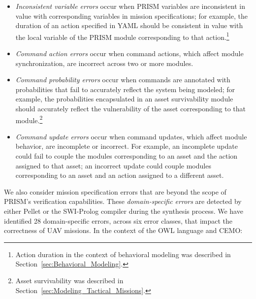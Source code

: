 \begin{itemize}

\item\emph{Inconsistent variable errors} occur when PRISM variables are inconsistent in value with corresponding variables in mission specifications; for example, the duration of an action specified in YAML should be consistent in value with the local variable of the PRISM module corresponding to that action.\footnote{Action duration in the context of behavioral modeling was described in Section~\ref{sec:Behavioral_Modeling}.}

\item\emph{Command action errors} occur when command actions, which affect module synchronization, are incorrect across two or more modules.

\item\emph{Command probability errors} occur when commands are annotated with probabilities that fail to accurately reflect the system being modeled; for example, the probabilities encapsulated in an asset survivability module should accurately reflect the vulnerability of the asset corresponding to that module.\footnote{Asset survivability was described in Section~\ref{sec:Modeling_Tactical_Missions}.}

\item\emph{Command update errors} occur when command updates, which affect module behavior, are incomplete or incorrect. For example, an incomplete update could fail to couple the modules corresponding to an asset and the action assigned to that asset; an incorrect update could couple modules corresponding to an asset and an action assigned to a different asset.

\end{itemize}

We also consider mission specification errors that are beyond the scope of PRISM's verification capabilities. These \emph{domain-specific errors} are detected by either Pellet or the SWI-Prolog compiler during the synthesis process. We have identified 28 domain-specific errors, across six error classes, that impact the correctness of UAV missions. In the context of the OWL language and CEMO:

